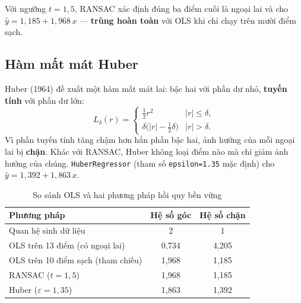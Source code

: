 Với ngưỡng $t = 1{,}5$, RANSAC xác định đúng ba điểm cuối là ngoại lai và cho $\hat{y} = 1{,}185 + 1{,}968\,x$ --- \textbf{trùng hoàn toàn} với OLS khi chỉ chạy trên mười điểm sạch.

\subsection{Hàm mất mát Huber}

Huber (1964) đề xuất một hàm mất mát lai: bậc hai với phần dư nhỏ, \textbf{tuyến tính} với phần dư lớn:
\begin{equation}
    L_\delta(r) = \begin{cases} \tfrac{1}{2}r^2 & |r| \leq \delta, \\[3pt] \delta\big(|r| - \tfrac{1}{2}\delta\big) & |r| > \delta. \end{cases}
\end{equation}
Vì phần tuyến tính tăng chậm hơn hẳn phần bậc hai, ảnh hưởng của mỗi ngoại lai bị \textbf{chặn}. Khác với RANSAC, Huber không loại điểm nào mà chỉ giảm ảnh hưởng của chúng. \texttt{HuberRegressor} (tham số \texttt{epsilon=1.35} mặc định) cho $\hat{y} = 1{,}392 + 1{,}863\,x$.

\begin{table}[H]
\centering
\begin{tabular}{|l|c|c|}
\hline
\textbf{Phương pháp} & \textbf{Hệ số góc} & \textbf{Hệ số chặn} \\
\hline
Quan hệ sinh dữ liệu & 2 & 1 \\ \hline
OLS trên 13 điểm (có ngoại lai) & 0,734 & 4,205 \\ \hline
OLS trên 10 điểm sạch (tham chiếu) & 1,968 & 1,185 \\ \hline
RANSAC ($t = 1{,}5$) & 1,968 & 1,185 \\ \hline
Huber ($\varepsilon = 1{,}35$) & 1,863 & 1,392 \\ \hline
\end{tabular}
\caption{So sánh OLS và hai phương pháp hồi quy bền vững}
\label{tab:robust}
\end{table}



